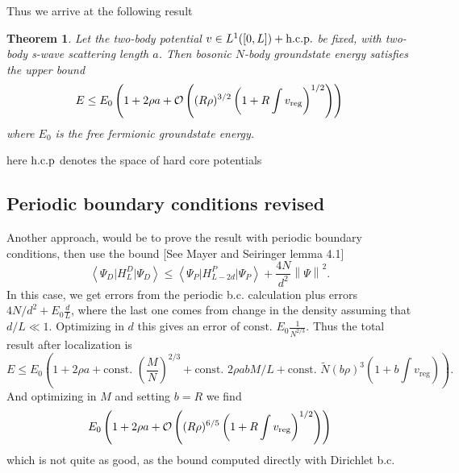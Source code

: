 \documentclass[a4paper,11pt]{article}
\newcommand{\norm}[1]{\left\lVert #1 \right\rVert}
\renewcommand{\braket}[1]{\left\langle#1\right\rangle}
\newtheorem{theorem}{Theorem}
\numberwithin{equation}{section}
\begin{document}
	Thus we arrive at the following result
	\begin{theorem}
		Let the two-body potential $ v\in L^{1}([0,L])+\textnormal{h.c.p.} $ be fixed, with two-body s-wave scattering length $ a $. Then bosonic $ N $-body groundstate energy satisfies the upper bound\begin{equation}
		E\leq E_0\left(1+2\rho a + \mathcal{O}\left((R\rho)^{3/2}\left(1+R \int v_{\textnormal{reg}}\right)^{1/2}\right)\right)
		\end{equation}
		where $ E_0 $ is the free fermionic groundstate energy.
	\end{theorem}
	here $ \textnormal{h.c.p} $ denotes the space of hard core potentials
	
	\subsection{Periodic boundary conditions revised}
	Another approach, would be to prove the result with periodic boundary conditions, then use the bound [See Mayer and Seiringer lemma 4.1] \begin{equation}
	\braket{\Psi_D\lvert H^D_L \rvert \Psi_D}\leq \braket{\Psi_P\lvert H^P_{L-2d}\rvert \Psi_P}+\frac{4N}{d^2}\norm{\Psi}^2.
	\end{equation}
	In this case, we get errors from the periodic b.c. calculation plus errors $ 4N/d^2+E_0\frac{d}{L} $, where the last one comes from change in the density assuming that $ d/L\ll 1 $. Optimizing in $ d $ this gives an error of $ \text{const. }E_0 \frac{1}{N^{2/3}} $. Thus the total result after localization is \begin{equation}
	E\leq E_0\left(1+2\rho a+\text{const. }\left(\frac{M}{N}\right)^{2/3}+\text{const. }2\rho abM/L+\text{const. }\tilde{N}(b\rho)^3\left(1+b\int v_{\text{reg}}\right)\right).
	\end{equation}
	And optimizing in $ M $ and setting $ b=R $ we find\begin{equation}
	E_0\left(1+2\rho a + \mathcal{O}\left((R\rho)^{6/5}\left(1+R \int v_{\textnormal{reg}}\right)^{1/2}\right)\right)
	\end{equation}
	which is not quite as good, as the bound computed directly with Dirichlet b.c.
\end{document}
